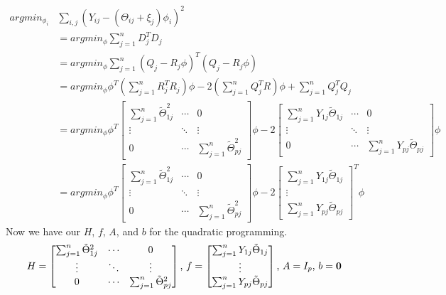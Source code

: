 \documentclass[11pt]{article}
\begin{document}
\begin{align*}
argmin_{\phi_i} &\sum_{i,j}(Y_{ij} - (\Theta_{ij}+\xi_j)\phi_i)^2 \\
&= argmin_{\phi} \sum_{j=1}^{n} D_j^T D_j\\
&= argmin_{\phi} \sum_{j=1}^{n} (Q_j - R_j \phi)^T (Q_j - R_j \phi)\\
&= argmin_{\phi} \phi^T (\sum_{j=1}^n R_j^T R_j) \phi 
- 2(\sum_{j=1}^{n}Q_j^TR)\phi + \sum_{j=1}^{n} Q_j^T Q_j\\
&= argmin_{\phi} 
\phi^T \begin{bmatrix}
\sum_{j=1}^{n} \tilde{\Theta}_{1j}^2 & \cdots & 0\\
\vdots & \ddots & \vdots\\
0 & \cdots & \sum_{j=1}^{n} \tilde{\Theta}_{pj}^2
\end{bmatrix}\phi
-2 \begin{bmatrix}
\sum_{j=1}^{n}Y_{1j}\tilde{\Theta}_{1j} & \cdots & 0\\
\vdots & \ddots & \vdots\\
0 & \cdots & \sum_{j=1}^{n} Y_{pj} \tilde{\Theta}_{pj}
\end{bmatrix}\phi\\
&= argmin_{\phi} 
\phi^T \begin{bmatrix}
\sum_{j=1}^{n} \tilde{\Theta}_{1j}^2 & \cdots & 0\\
\vdots & \ddots & \vdots\\
0 & \cdots & \sum_{j=1}^{n} \tilde{\Theta}_{pj}^2
\end{bmatrix}\phi
-2 \begin{bmatrix}
\sum_{j=1}^{n}Y_{1j}\tilde{\Theta}_{1j} \\
\vdots \\
\sum_{j=1}^{n} Y_{pj} \tilde{\Theta}_{pj}
\end{bmatrix}^T \phi
\end{align*}
Now we have our $H$, $f$, $A$, and $b$ for the quadratic programming.
$$H = \begin{bmatrix}
\sum_{j=1}^{n} \tilde{\Theta}_{1j}^2 & \cdots & 0\\
\vdots & \ddots & \vdots\\
0 & \cdots & \sum_{j=1}^{n} \tilde{\Theta}_{pj}^2
\end{bmatrix}\text{,  }f = \begin{bmatrix}
\sum_{j=1}^{n}Y_{1j}\tilde{\Theta}_{1j} \\
\vdots \\
\sum_{j=1}^{n} Y_{pj} \tilde{\Theta}_{pj}
\end{bmatrix}\text{,  } A = I_{p} \text{,  }b = \bf{0}$$
\end{document}
